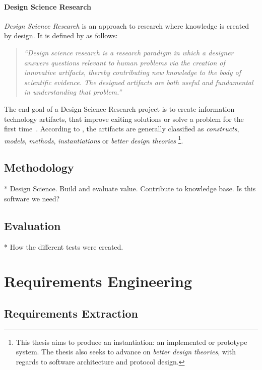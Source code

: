 \paragraph{Design Science Research}
\textit{Design Science Research} is an approach to research where knowledge is created by design. It is defined by \textcite[p.~5]{alanhevnerDesignResearchInformation2010} as follows:

\begin{quote}
  \textit{``Design science research is a research paradigm in which a designer answers questions relevant to human problems via the creation of innovative artifacts, thereby contributing new knowledge to the body of scientific evidence.
  The designed artifacts are both useful and fundamental in understanding that problem.''}
\end{quote}

The end goal of a Design Science Research project is to create information technology \glspl{artifact}, that improve exiting solutions or solve a problem for the first time~\cite[p.~6]{alanhevnerDesignResearchInformation2010}.
According to \textcite{alanhevnerDesignResearchInformation2010}, the artifacts are generally classified as \textit{constructs}, \textit{models}, \textit{methods}, \textit{instantiations} or \textit{better design theories}%
\footnote{This thesis aims to produce an instantiation: an implemented or prototype system. The thesis also seeks to advance on \textit{better design theories}, with regards to software architecture and protocol design.}.


\subsection{Methodology}


* Design Science. Build and evaluate value. Contribute to knowledge base. Is this software we need?

\subsection{Evaluation}

* How the different tests were created.

\section{Requirements Engineering}

\subsection{Requirements Extraction}


